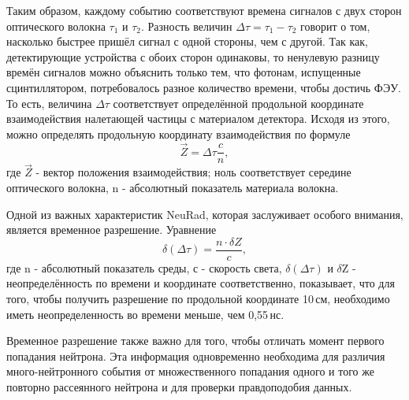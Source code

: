 Таким образом, каждому событию соответствуют времена сигналов с двух сторон оптического волокна $\tau_1$ и $\tau_2$. 
Разность величин $\Delta \tau = \tau_1 - \tau_2$ говорит о том, насколько быстрее пришёл сигнал с одной стороны, чем с другой. 
Так как, детектирующие устройства с обоих сторон одинаковы, то ненулевую разницу времён сигналов можно объяснить только тем, что фотонам, испущенные сцинтиллятором, потребовалось разное количество времени, чтобы достичь ФЭУ. То есть, величина $\Delta\tau$ соответствует определённой продольной координате взаимодействия налетающей частицы с материалом детектора. Исходя из этого, можно определять продольную координату взаимодействия по формуле
\begin{equation}
\label{koordinate}
\vec{Z} = \Delta \tau \frac{c}{n},
\end{equation}
где $\vec{Z}$ - вектор положения взаимодействия; ноль соответствует середине оптического волокна, n - абсолютный показатель материала волокна.

Одной из важных характеристик NeuRad, которая заслуживает особого внимания, является временное разрешение.  Уравнение 
\begin{equation} \label{eq:distance}
\delta(\Delta \tau) = \frac{n\cdot\delta Z}{c},
\end{equation}
где n - абсолютный показатель среды, с - скорость света, $\delta(\Delta \tau)$ и $\delta$Z - неопределённость по времени и координате соответственно, показывает, что для того, чтобы получить разрешение по продольной координате 10\,см, необходимо иметь неопределенность во времени меньше, чем 0,55\,нс. 

Временное разрешение также важно для того, чтобы отличать момент первого попадания нейтрона. Эта информация одновременно необходима для различия много-нейтронного события от множественного попадания одного и того же повторно рассеянного нейтрона и для проверки правдоподобия данных.